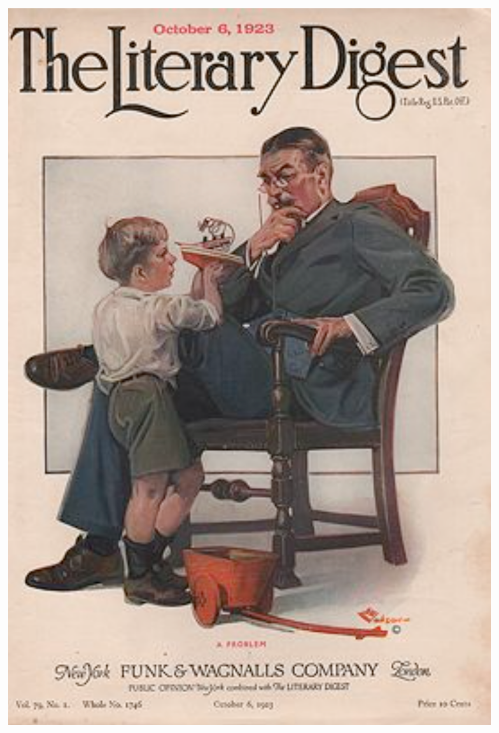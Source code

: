 \documentclass[aspectratio=169]{beamer}
\theoremstyle{principle}
\begin{document}
\begin{frame}
\begin{columns}
\begin{column}{0.5\textwidth}
\end{column}
\begin{column}{0.5\textwidth}
\begin{center}
\includegraphics[scale=0.3]{LD.png}
\end{center}
\end{column}
\end{columns}

\end{frame}
\end{document}
